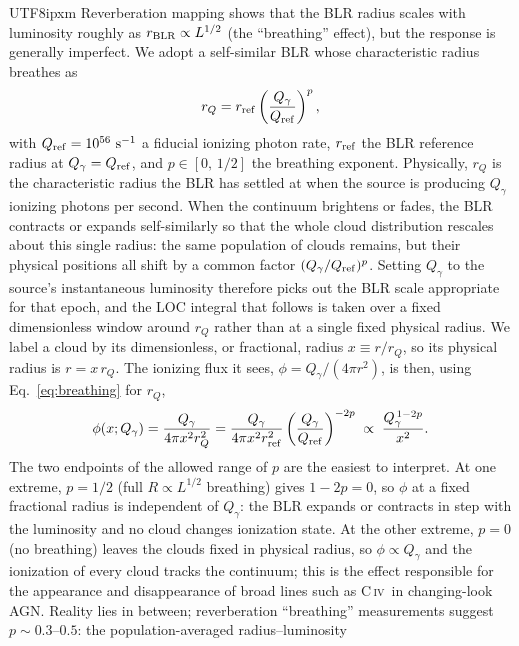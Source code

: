 \documentclass[linenumbers,trackchanges]{aastex701}
\def\CIV{C\,\textsc{iv}}
\begin{document}
\begin{CJK*}{UTF8}{ipxm}
Reverberation mapping shows that the BLR radius scales with luminosity roughly as
$r_{\rm BLR}\propto L^{1/2}$ (the ``breathing'' effect), but the response is generally
imperfect.  We adopt a self-similar BLR whose characteristic radius breathes as
\begin{equation}
    r_Q = r_{\rm ref}\left(\frac{Q_\gamma}{Q_{\rm ref}}\right)^{p},
    \label{eq:breathing}
\end{equation}
with $Q_{\rm ref}=10^{56}~{\rm s^{-1}}$ a fiducial ionizing photon rate, $r_{\rm ref}$ the
BLR reference radius at $Q_\gamma=Q_{\rm ref}$, and $p\in[0,\,1/2]$ the breathing exponent.
Physically, $r_Q$ is the characteristic radius the BLR has settled at when the source is
producing $Q_\gamma$ ionizing photons per second.  When the continuum brightens or fades,
the BLR contracts or expands self-similarly so that the whole cloud distribution rescales
about this single radius: the same population of clouds remains, but their physical
positions all shift by a common factor $(Q_\gamma/Q_{\rm ref})^{p}$.  Setting $Q_\gamma$ to
the source's instantaneous luminosity therefore picks out the BLR scale appropriate for
that epoch, and the LOC integral that follows is taken over a fixed dimensionless window
around $r_Q$ rather than at a single fixed physical radius.
We label a cloud by its dimensionless, or fractional, radius $x\equiv r/r_Q$, so its
physical radius is $r=x\,r_Q$.  The ionizing flux it sees, $\phi=Q_\gamma/(4\pi r^2)$, is then,
using Eq.~\ref{eq:breathing} for $r_Q$,
\begin{equation}
    \phi(x;Q_\gamma)
    = \frac{Q_\gamma}{4\pi x^2 r_Q^2}
    = \frac{Q_\gamma}{4\pi x^2 r_{\rm ref}^2}\left(\frac{Q_\gamma}{Q_{\rm ref}}\right)^{-2p}
    \;\propto\; \frac{Q_\gamma^{\,1-2p}}{x^2}.
    \label{eq:phix}
\end{equation}
The two endpoints of the allowed range of $p$ are the easiest to interpret.  At one extreme,
$p=1/2$ (full $R\propto L^{1/2}$ breathing) gives $1-2p=0$, so $\phi$ at a fixed fractional
radius is independent of $Q_\gamma$: the BLR expands or contracts in step with the luminosity
and no cloud changes ionization state.  At the other extreme, $p=0$ (no breathing) leaves the
clouds fixed in physical radius, so $\phi\propto Q_\gamma$ and the ionization of every cloud
tracks the continuum; this is the effect responsible for the appearance and disappearance of
broad lines such as \CIV\ in changing-look AGN.  Reality lies in between; reverberation
``breathing'' measurements suggest $p\sim0.3$--$0.5$: the population-averaged radius--luminosity

\end{CJK*}
\end{document}
